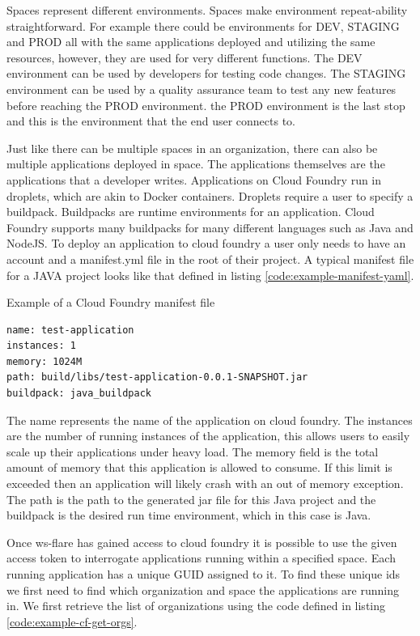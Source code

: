 Spaces represent different environments. Spaces make environment repeat-ability straightforward. For example there could be environments for DEV, STAGING and PROD  all with the same applications deployed and utilizing the same resources, however, they are used for very different functions. The DEV environment can be used by developers for testing code changes. The STAGING environment can be used by a quality assurance team to test any new features before reaching the PROD environment. the PROD environment is the last stop and this is the environment that the end user connects to.

Just like there can be multiple spaces in an organization, there can also be multiple applications deployed in space. The applications themselves are the applications that a developer writes. Applications on Cloud Foundry run in droplets, which are akin to Docker containers. Droplets require a user to specify a buildpack. Buildpacks are runtime environments for an application. Cloud Foundry supports many buildpacks for many different languages such as Java and NodeJS. To deploy an application to cloud foundry a user only needs to have an account and a manifest.yml file in the root of their project. A typical manifest file for a JAVA project looks like that defined in listing \ref{code:example-manifest-yaml}.

\begin{listing}[H]
    \caption{Example of a Cloud Foundry manifest file}
    \label{code:example-manifest-yaml}
    \begin{verbatim}
name: test-application
instances: 1
memory: 1024M
path: build/libs/test-application-0.0.1-SNAPSHOT.jar
buildpack: java_buildpack
\end{verbatim}
\end{listing}

The name represents the name of the application on cloud foundry. The instances are the number of running instances of the application, this allows users to easily scale up their applications under heavy load. The memory field is the total amount of memory that this application is allowed to consume. If this limit is exceeded then an application will likely crash with an out of memory exception. The path is the path to the generated jar file for this Java project and the buildpack is the desired run time environment, which in this case is Java.

Once ws-flare has gained access to cloud foundry it is possible to use the given access token to interrogate applications running within a specified space. Each running application has a unique GUID assigned to it. To find these unique ids we first need to find which organization and space the applications are running in. We first retrieve the list of organizations using the code defined in listing \ref{code:example-cf-get-orgs}.


